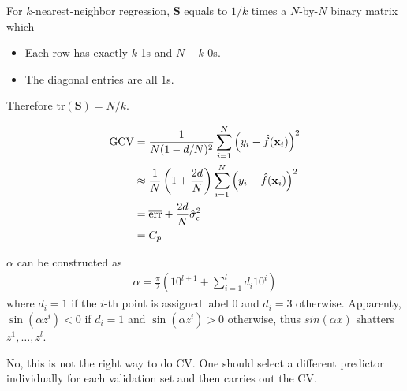 \begin{exercise}
  For $k$-nearest-neighbor regression, $\mathbf{S}$ equals to $1/k$ times a
  $N$-by-$N$ binary matrix which
  \begin{itemize}
    \item Each row has exactly $k$ 1s and $N-k$ 0s.
    \item The diagonal entries are all 1s.
  \end{itemize}
  Therefore $\mbox{tr}(\mathbf{S}) = N/k$.
\end{exercise}

\begin{exercise}
  \begin{align}
    \mbox{GCV} &= \frac{1}{N(1-d/N)^2}\sum_{i=1}^N\left(y_i -
    \hat{f}(\mathbf{x}_i)\right)^2 \notag\\
    &\approx \frac{1}{N}\left(1 + \frac{2d}{N} \right) \sum_{i=1}^N\left(y_i -
    \hat{f}(\mathbf{x}_i)\right)^2  \notag\\
    &= \overline{\mbox{err}} + \frac{2d}{N}\hat{\sigma}_{\epsilon}^2 \notag\\
    &= C_p
  \end{align}
\end{exercise}

\begin{exercise}
  $\alpha$ can be constructed as
  \begin{align}
    \alpha = \frac{\pi}{2}\left(10^{l+1} + \sum_{i=1}^ld_i10^i\right)
  \end{align}
  where $d_i = 1$ if the $i$-th point is assigned label 0 and $d_i =3$
  otherwise. Apparenty, $\sin(\alpha z^i) <0 $ if $d_i = 1$ and $\sin(\alpha
  z^i) >0 $ otherwise, thus $sin(\alpha x)$ shatters $z^1,\ldots,z^l$.
\end{exercise}

\begin{exercise}[(Program)]
\end{exercise}

\begin{exercise}
  No, this is not the right way to do CV. One should select a different
  predictor individually for each validation set and then carries out the CV.
\end{exercise}